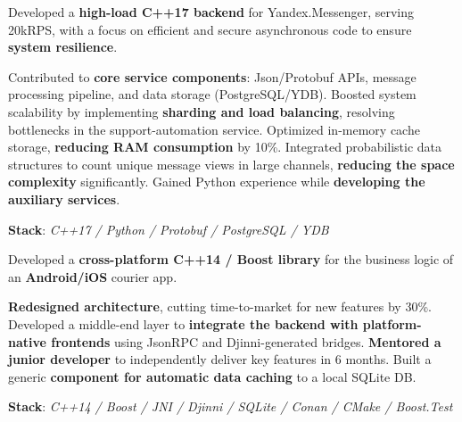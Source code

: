 \documentclass[]{deedy-resume}
\begin{document}
\begin{minipage}[t]{0.70\textwidth}
\sectionspace



Developed a \textbf{high-load C++17 backend} for Yandex.Messenger, serving 20kRPS, with a focus on efficient and secure asynchronous code to ensure \textbf{system resilience}.
\begin{descritemize}
    \descritem Contributed to \textbf{core service components}: Json/Protobuf APIs, message processing pipeline, and data storage (PostgreSQL/YDB).
    \descritem Boosted system scalability by implementing  \textbf{sharding and load balancing}, resolving bottlenecks in the support-automation service.
    \descritem Optimized in-memory cache storage, \textbf{reducing RAM consumption} by 10\%.
    \descritem Integrated probabilistic data structures to count unique message views in large channels, \textbf{reducing the space complexity} significantly.
    \descritem Gained Python experience while \textbf{developing the auxiliary services}.
\end{descritemize}
\textbf{Stack}: \textit{C++17 / Python / Protobuf / PostgreSQL / YDB}

\sectionspace



Developed a \textbf{cross-platform C++14 / Boost library} for the business logic of an \textbf{Android/iOS} courier app.
\begin{descritemize}
    \descritem \textbf{Redesigned architecture}, cutting time-to-market for new features by 30\%.
    \descritem Developed a middle-end layer to \textbf{integrate the backend with platform-native frontends} using JsonRPC and Djinni-generated bridges.
    \descritem \textbf{Mentored a junior developer} to independently deliver key features in 6 months.
    \descritem Built a generic \textbf{component for automatic data caching} to a local SQLite DB.
\end{descritemize}
\textbf{Stack}: \textit{C++14 / Boost / JNI / Djinni / SQLite / Conan / CMake / Boost.Test}

\sectionspace

\end{minipage}
\end{document}

